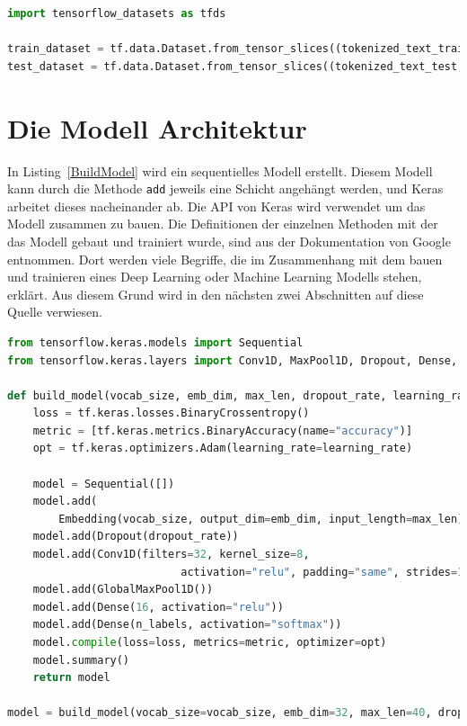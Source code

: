 \begin{lstlisting}[language=Python,caption=Die Dataset Erstellung, label={DataSet}]
import tensorflow_datasets as tfds

train_dataset = tf.data.Dataset.from_tensor_slices((tokenized_text_train, y))
test_dataset = tf.data.Dataset.from_tensor_slices((tokenized_text_test, y_test))
\end{lstlisting}





\section{Die Modell Architektur}



In Listing~\ref{BuildModel} wird ein sequentielles Modell erstellt. Diesem Modell kann durch die Methode \texttt{add} jeweils eine Schicht angehängt werden, und Keras arbeitet dieses nacheinander ab. Die API von Keras wird verwendet um das Modell zusammen zu bauen. Die Definitionen der einzelnen Methoden mit der das Modell gebaut und trainiert wurde, sind aus der Dokumentation von Google \citep{google1} entnommen. Dort werden viele Begriffe, die im Zusammenhang mit dem bauen und trainieren eines Deep Learning oder Machine Learning Modells stehen, erklärt. Aus diesem Grund wird in den nächsten zwei Abschnitten auf diese Quelle verwiesen.

\begin{lstlisting}[language=Python,caption=Das Bilden des Models, label={BuildModel}]
from tensorflow.keras.models import Sequential
from tensorflow.keras.layers import Conv1D, MaxPool1D, Dropout, Dense, GlobalMaxPool1D, Embedding, Activation

def build_model(vocab_size, emb_dim, max_len, dropout_rate, learning_rate, n_labels):
    loss = tf.keras.losses.BinaryCrossentropy()
    metric = [tf.keras.metrics.BinaryAccuracy(name="accuracy")]
    opt = tf.keras.optimizers.Adam(learning_rate=learning_rate)

    model = Sequential([])
    model.add(
        Embedding(vocab_size, output_dim=emb_dim, input_length=max_len))
    model.add(Dropout(dropout_rate))
    model.add(Conv1D(filters=32, kernel_size=8,
                           activation="relu", padding="same", strides=1))
    model.add(GlobalMaxPool1D())
    model.add(Dense(16, activation="relu"))
    model.add(Dense(n_labels, activation="softmax"))
    model.compile(loss=loss, metrics=metric, optimizer=opt)
    model.summary()
    return model
    
model = build_model(vocab_size=vocab_size, emb_dim=32, max_len=40, dropout_rate=0.3, learning_rate=0.00006, n_labels=len(labels))
\end{lstlisting}


